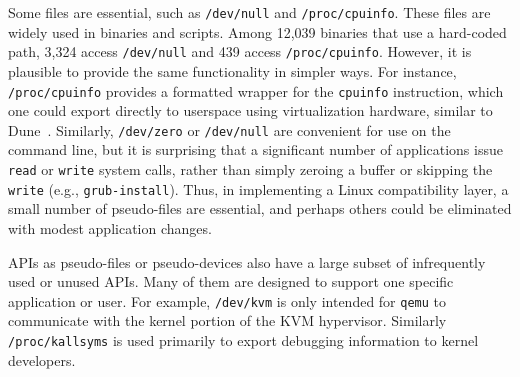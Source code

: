 Some files %
are essential,
such as {\tt /dev/null} and {\tt /proc\-/\-cpuinfo}.
These files are widely used in %
binaries and scripts.
Among 12,039 binaries that use a hard-coded path,
3,324 access {\tt /dev/null} and 439 access {\tt /proc/cpuinfo}.
However, it is plausible to provide the same functionality in
simpler ways.
For instance, {\tt /proc/cpuinfo} provides a formatted wrapper for
the {\tt cpuinfo} instruction, which one could export
directly to userspace using virtualization hardware, similar to Dune~\cite{belay12dune}.
Similarly, {\tt /dev/zero} or {\tt /dev/null} are convenient for use on the command
line, but it is surprising that a significant number of applications
issue {\tt read} or {\tt write} system calls, rather than simply zeroing a buffer
or skipping the {\tt write}
(e.g., {\tt grub-install}).
Thus, in implementing a Linux compatibility layer, a small number of pseudo-files
are essential, and perhaps others could be eliminated with modest application changes.



APIs as pseudo-files or pseudo-devices also have a large subset
of infrequently used or unused APIs.
Many of them
are designed to support one specific application or user.
For example, {\tt /dev/kvm} is only intended for {\tt qemu} to
communicate with the kernel portion of the KVM hypervisor.
Similarly {\tt /proc/kallsyms} is used primarily to export debugging information to kernel developers.

